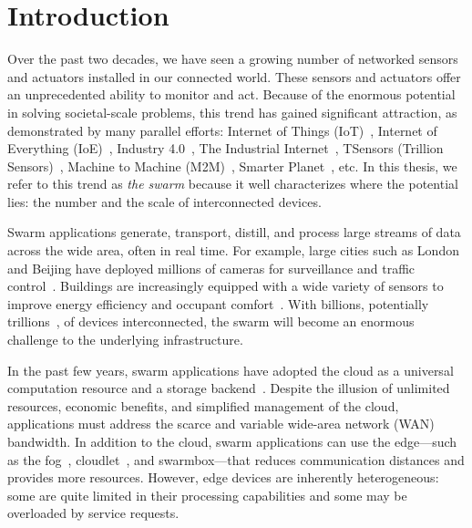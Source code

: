 \documentclass[thesis.tex]{subfiles}
\begin{document}
\chapter{Introduction}

Over the past two decades, we have seen a growing number of networked sensors
and actuators installed in our connected world. These sensors and actuators
offer an unprecedented ability to monitor and act. Because of the enormous
potential in solving societal-scale problems, this trend has gained significant
attraction, as demonstrated by many parallel efforts: Internet of Things
(IoT)~\cite{atzori2010internet}, Internet of Everything
(IoE)~\cite{bradley2013internet}, Industry 4.0~\cite{lasi2014industry}, The
Industrial Internet~\cite{eigner2018industrial}, TSensors (Trillion
Sensors)~\cite{bogue2014towards}, Machine to Machine
(M2M)~\cite{anton2014machine}, Smarter Planet~\cite{palmisano2008smarter},
etc. In this thesis, we refer to this trend as \textit{the swarm} because it
well characterizes where the potential lies: the number and the scale of
interconnected devices.

Swarm applications generate, transport, distill, and process large streams of
data across the wide area, often in real time. For example, large cities such as
London and Beijing have deployed millions of cameras for surveillance and
traffic control~\cite{skynet, london.surveillance}. Buildings are increasingly
equipped with a wide variety of sensors to improve energy efficiency and
occupant comfort~\cite{dawson2010smap, krioukov2012building}. With billions,
potentially trillions~\cite{middleton2013forecast}, of devices interconnected,
the swarm will become an enormous challenge to the underlying infrastructure.

In the past few years, swarm applications have adopted the cloud as a universal
computation resource and a storage backend~\cite{carriots, grovestreams, sami,
  xively, gupta2014bolt, zachariah1001internet}. Despite the illusion of
unlimited resources, economic benefits, and simplified management of the cloud,
applications must address the scarce and variable wide-area network (WAN)
bandwidth. In addition to the cloud, swarm applications can use the edge---such
as the fog~\cite{bonomi2012fog, bar2013fog}, cloudlet~\cite{ha2014towards,
  satyanarayanan2009case, chen2018application}, and swarmbox---that reduces
communication distances and provides more resources. However, edge devices are
inherently heterogeneous: some are quite limited in their processing
capabilities and some may be overloaded by service requests.
\end{document}
